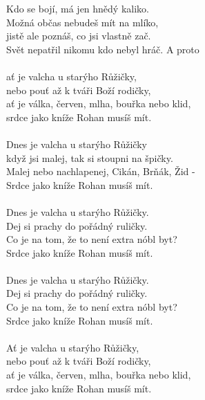 \begin{multicols}{2}
Kdo se bojí, má jen hnědý kaliko.\\
Možná občas nebudeš mít na mlíko,\\
jistě ale poznáš, co jsi vlastně zač.\\
Svět nepatřil nikomu kdo nebyl hráč. A proto\\
\\
ať je valcha u starýho Růžičky,\\
nebo pouť až k tváři Boží rodičky,\\
ať je válka, červen, mlha, bouřka nebo klid,\\
srdce jako kníže Rohan musíš mít.\\
\\
Dnes je valcha u starýho Růžičky\\
když jsi malej, tak si stoupni na špičky.\\
Malej nebo nachlapenej, Cikán, Brňák, Žid -\\
Srdce jako kníže Rohan musíš mít.\\
\\
Dnes je valcha u starýho Růžičky.\\
Dej si prachy do pořádný ruličky.\\
Co je na tom, že to není extra nóbl byt?\\
 Srdce jako kníže Rohan musíš mít.\\
\\
Dnes je valcha u starýho Růžičky.\\
Dej si prachy do pořádný ruličky.\\
Co je na tom, že to není extra nóbl byt?\\
Srdce jako kníže Rohan musíš mít.\\
\\
Ať je valcha u starýho Růžičky,\\
nebo pouť až k tváři Boží rodičky,\\
ať je válka, červen, mlha, bouřka nebo klid,\\
srdce jako kníže Rohan musíš mít.\\
\end{multicols}